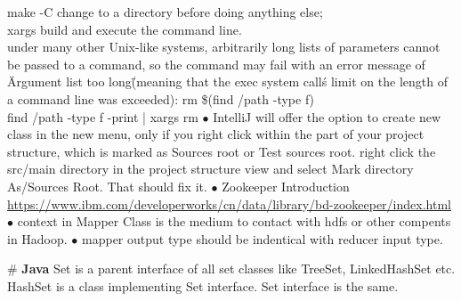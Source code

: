 make -C change to a directory before doing anything else;\\
xargs build and execute the command line.\\
under many other Unix-like systems, arbitrarily long lists of parameters cannot be passed to a command, so the command may fail with an error message of \"Argument list too long\" (meaning that the exec system call\'s limit on the length of a command line was exceeded): rm \$(find /path -type f)\\
find /path -type f -print | xargs rm
\bigskip\newline
$\bullet$   {\color{red}IntelliJ} will offer the option to create new class in the new menu, only if you right click within the part of your project structure, which is marked as Sources root or Test sources root.  right click the src/main directory in the project structure view and select Mark directory As/Sources Root. That should fix it.\bigskip
\newline
$\bullet$ {\color{green}Zookeeper Introduction} \url{https://www.ibm.com/developerworks/cn/data/library/bd-zookeeper/index.html}
\newline$\bullet$ context in Mapper Class is the medium to contact with hdfs or other compents in Hadoop.
\newline$\bullet$ mapper output type should be indentical with reducer input type.

\# \textbf{Java}
Set is a parent interface of all set classes like TreeSet, LinkedHashSet etc. HashSet is a class implementing Set interface. Set interface is the same.


